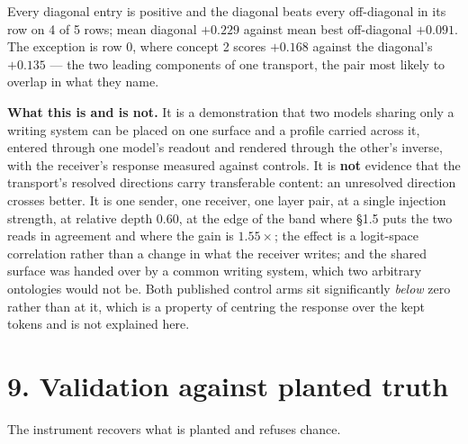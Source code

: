 \documentclass[10pt,letterpaper,twocolumn]{article}
\begin{document}

Every diagonal entry is positive and the diagonal beats every off-diagonal in its row on 4 of 5
rows; mean diagonal \(+0.229\) against mean best off-diagonal \(+0.091\). The exception is row 0, where
concept 2 scores \(+0.168\) against the diagonal's \(+0.135\) --- the two leading components of one
transport, the pair most likely to overlap in what they name.

\textbf{What this is and is not.} It is a demonstration that two models sharing only a writing system can
be placed on one surface and a profile carried across it, entered through one model's readout and
rendered through the other's inverse, with the receiver's response measured against controls. It is
\textbf{not} evidence that the transport's resolved directions carry transferable content: an unresolved
direction crosses better. It is one sender, one receiver, one layer pair, at a single injection
strength, at relative depth 0.60, at the edge of the band where §1.5 puts the two reads in agreement and
where the gain is \(1.55\times\); the effect is a
logit-space correlation rather than a change in what the receiver writes; and the shared surface was
handed over by a common writing system, which two arbitrary ontologies would not be. Both published
control arms sit significantly \emph{below} zero rather than at it, which is a property of centring the
response over the kept tokens and is not explained here.

\section{9. Validation against planted truth}\label{9-validation-against-planted-truth}

The instrument recovers what is planted and refuses chance.
\end{document}
